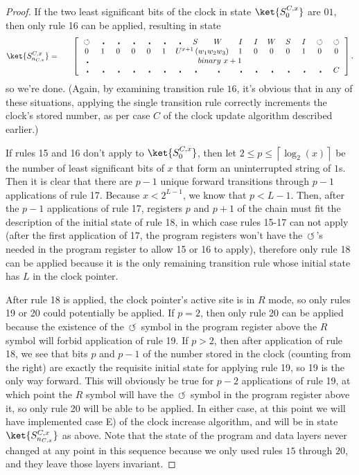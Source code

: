 \documentclass[11pt,letterpaper]{article}
\newcommand{\<}{\langle}
\renewcommand{\>}{\rangle}
\newcommand{\tur}{\,\circlearrowleft\,}   %
\newcommand{\bul}{\:\:\centerdot\:}       %
\newcommand{\iga}{\:I\,}                  %
\newcommand{\wga}{W}						%
\newcommand{\sga}{\:S\,}					%
\begin{document}
\begin{proof}
If the two least significant bits of the clock in state $\ket{S^{C,x}_0}$ are $01$, then only rule 16 can be applied, resulting in state 
	\begin{eqnarray}
			\ket{S^{C,x}_{n_{C,x}}} &=& \quad \left[ \begin{array}{cccccccccccccccc}
				\tur & \bul & 
				\bul & \bul & \bul & \bul & \bul & \sga & \wga & \iga & \iga & 
			\wga & \sga & \iga & \tur & \tur
				\\		
				0    & 1    & 0    & 0    & 0    & 1    & 
				\multicolumn{3}{c}{U^{x+1}\left(w_1w_2w_3\right)}  &
				1    & 0    & 0    & 0    & 1    & 0 & 0
				\\
				\bul & \multicolumn{15}{c}{binary~x+1}
				\\
				\bul & \bul & \bul & \bul & \bul & \bul & \bul & \bul & \bul & \bul & \bul & \bul & \bul & \bul & \bul & C
		 	\end{array} \right]. \label{endstate}
		\end{eqnarray}
so we're done. (Again, by examining transition rule $16$, it's obvious that in any of these situations, applying the single transition rule correctly increments the clock's stored number, as per case $C$ of the clock update algorithm described earlier.)

If rules 15 and 16 don't apply to $\ket{S^{C,x}_0}$, then let $2\leq p
\leq\left\lceil{\log_{2}(x)}\right\rceil$ be the number of least significant bits of $x$ that form an uninterrupted string of $1$s. Then it is clear that there are $p-1$ unique forward transitions through $p-1$ applications of rule 17. Because $x<2^{L-1}$, we know that $p< L-1$. Then, after the $p-1$ applications of rule 17, registers $p$ and $p+1$ of the chain must fit the description of the initial state of rule 18, in which case rules 15-17 can not apply (after the first application of 17, the program registers won't have the $\tur$'s needed in the program register to allow 15 or 16 to apply), therefore only rule 18 can be applied because it is the only remaining transition rule whose initial state has $L$ in the clock pointer.

After rule 18 is applied, the clock pointer's active site is in $R$ mode, so only rules 19 or 20 could potentially be applied. If $p=2$, then only rule 20 can be applied because the existence of the $\tur$ symbol in the program register above the $R$ symbol will forbid application of rule 19. If $p>2$, then after application of rule 18, we see that bits $p$ and $p-1$ of the number stored in the clock (counting from the right) are exactly the requisite initial state for applying rule 19, so 19 is the only way forward. This will obviously be true for $p-2$ applications of rule 19, at which point the $R$ symbol will have the $\tur$ symbol in the program register above it, so only rule 20 will be able to be applied. In either case, at this point we will have implemented case E) of the clock increase algorithm, and will be in state $\ket{S^{C,x}_{n_{C,x}}}$ as above. Note that the state of the program and data layers never changed at any point in this sequence because we only used rules $15$ through $20$, and they leave those layers invariant.


\end{proof}
\end{document}
